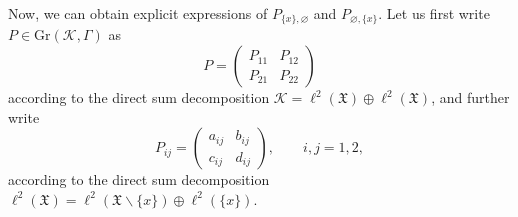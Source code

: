 \documentclass[11pt]{article}
\numberwithin{equation}{section}
\numberwithin{equation}{section}
\newcommand{\mfrak}[1]{\mathfrak{#1}}
\newcommand{\mcal}[1]{\mathcal{#1}}
\newcommand{\mrm}[1]{\mathrm{#1}}
\begin{document}
Now, we can obtain explicit expressions of $P_{\{x\},\varnothing}$ and $P_{\varnothing,\{x\}}$.
Let us first write $P\in \mrm{Gr}(\mcal{K},\Gamma)$ as
\begin{equation*}
	P=\left(
	\begin{matrix}
	P_{11} & P_{12} \\
	P_{21} & P_{22}
	\end{matrix}
	\right)
\end{equation*}
according to the direct sum decomposition $\mcal{K}=\ell^{2}(\mfrak{X})\oplus \ell^{2}(\mfrak{X})$, and further write
\begin{equation*}
	P_{ij}=\left(
	\begin{matrix}
		a_{ij} & b_{ij} \\
		c_{ij} & d_{ij}
	\end{matrix}
	\right),\qquad i,j=1,2,
\end{equation*}
according to the direct sum decomposition $\ell^{2}(\mfrak{X})=\ell^{2}(\mfrak{X}\backslash\{x\})\oplus \ell^{2}(\{x\})$.
\end{document}

